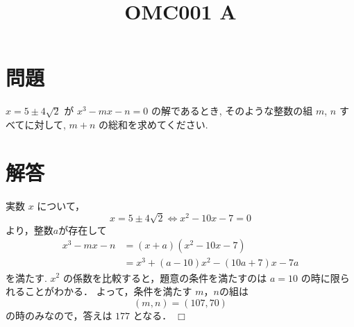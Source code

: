 \documentclass[uplatex,dvipdfmx,a4paper]{jsarticle}
\title{OMC001 A}
\date{}
\author{}
\def\qed{\hfill $\Box$}
\newenvironment{problem}{\section*{問題}}{}
\newenvironment{solution}{\section*{解答}}{\qed}
\begin{document}
\maketitle
\begin{problem}
    $x=5 \pm 4\sqrt{2}$ が $x^3-mx-n=0$  の解であるとき, そのような整数の組 $m$, $n$ すべてに対して, $m+n$ の総和を求めてください.
\end{problem}

\begin{solution}
    実数 $x$ について，
    \[
        x = 5 \pm 4 \sqrt{2} \Leftrightarrow x^2-10x-7=0 
    \]
    より，整数$a$が存在して
    \begin{align*}
        x^3-mx-n &= (x+a)(x^2-10x-7) \\
        &= x^3+(a-10)x^2-(10a+7)x-7a       
    \end{align*}
    を満たす.
    $x^2$ の係数を比較すると，題意の条件を満たすのは $a=10$ の時に限られることがわかる．
    よって，条件を満たす $m$，$n$の組は
    \[
        (m, n) = (107, 70)
    \]
    の時のみなので，答えは $177$ となる．
\end{solution}
\end{document}
